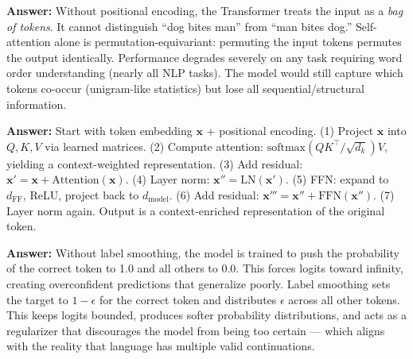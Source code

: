 \documentclass[11pt, a4paper]{article}
\begin{document}
\begin{notebox}
\textbf{Answer:} Without positional encoding, the Transformer treats the input as a \emph{bag of tokens}. It cannot distinguish ``dog bites man'' from ``man bites dog.'' Self-attention alone is permutation-equivariant: permuting the input tokens permutes the output identically. Performance degrades severely on any task requiring word order understanding (nearly all NLP tasks). The model would still capture which tokens co-occur (unigram-like statistics) but lose all sequential/structural information.
\end{notebox}

\begin{notebox}
\textbf{Answer:} Start with token embedding $\mathbf{x}$ + positional encoding. (1) Project $\mathbf{x}$ into $Q, K, V$ via learned matrices. (2) Compute attention: $\text{softmax}(QK^\top/\sqrt{d_k})V$, yielding a context-weighted representation. (3) Add residual: $\mathbf{x}' = \mathbf{x} + \text{Attention}(\mathbf{x})$. (4) Layer norm: $\mathbf{x}'' = \text{LN}(\mathbf{x}')$. (5) FFN: expand to $d_{\text{FF}}$, ReLU, project back to $d_{\text{model}}$. (6) Add residual: $\mathbf{x}''' = \mathbf{x}'' + \text{FFN}(\mathbf{x}'')$. (7) Layer norm again. Output is a context-enriched representation of the original token.
\end{notebox}

\begin{notebox}
\textbf{Answer:} Without label smoothing, the model is trained to push the probability of the correct token to 1.0 and all others to 0.0. This forces logits toward infinity, creating overconfident predictions that generalize poorly. Label smoothing sets the target to $1-\epsilon$ for the correct token and distributes $\epsilon$ across all other tokens. This keeps logits bounded, produces softer probability distributions, and acts as a regularizer that discourages the model from being too certain --- which aligns with the reality that language has multiple valid continuations.
\end{notebox}
\end{document}

